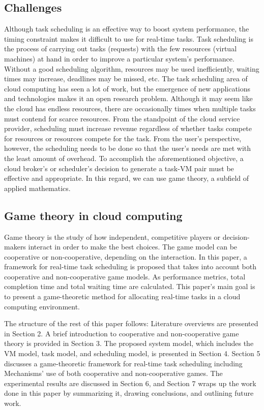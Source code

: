 \documentclass[conference]{IEEEtran}
\begin{document}
\subsection{Challenges}
Although task scheduling is an effective way to boost system performance, the timing constraint makes it difficult to use for real-time tasks. Task scheduling is the process of carrying out tasks (requests) with the few resources (virtual machines) at hand in order to improve a particular system's performance\cite{arunarani2019task}. Without a good scheduling algorithm, resources may be used inefficiently, waiting times may increase, deadlines may be missed, etc. The task scheduling area of cloud computing has seen a lot of work, but the emergence of new applications and technologies makes it an open research problem. Although it may seem like the cloud has endless resources, there are occasionally times when multiple tasks must contend for scarce resources. From the standpoint of the cloud service provider, scheduling must increase revenue regardless of whether tasks compete for resources or resources compete for the task. From the user's perspective, however, the scheduling needs to be done so that the user's needs are met with the least amount of overhead. To accomplish the aforementioned objective, a cloud broker's or scheduler's decision to generate a task-VM pair must be effective and appropriate. In this regard, we can use game theory, a subfield of applied mathematics. 
\subsection{Game theory in cloud computing}
Game theory is the study of how independent, competitive players or decision-makers interact in order to make the best choices\cite{li2014non}. The game model can be cooperative or non-cooperative, depending on the interaction. In this paper, a framework for real-time task scheduling is proposed that takes into account both cooperative and non-cooperative game models. As performance metrics, total completion time and total waiting time are calculated. This paper's main goal is to present a game-theoretic method for allocating real-time tasks in a cloud computing environment. 




The structure of the rest of this paper follows: Literature overviews are presented in Section 2. A brief introduction to cooperative and non-cooperative game theory is provided in Section 3. The proposed system model, which includes the VM model, task model, and scheduling model, is presented in Section 4. Section 5 discusses a game-theoretic framework for real-time task scheduling including Mechanisms' use of both cooperative and non-cooperative games. The experimental results are discussed in Section 6, and Section 7 wraps up the work done in this paper by summarizing it, drawing conclusions, and outlining future work.
\end{document}

